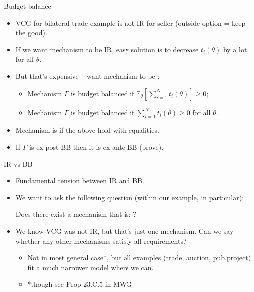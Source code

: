 \documentclass[english,10pt
,aspectratio=169
,handout
]{beamer}
\begin{document}
\begin{frame}{Budget balance}
\begin{itemize}
	\item VCG for bilateral trade example is not IR for seller (outside option = keep the good).
	\pause\medskip
	\item If we want mechanism to be IR, easy solution is to decrease $t_i(\theta)$ by a lot, for all $\theta$.
	\item But that's expensive -- want mechanism to be :
	\pause
	\begin{definition}[BB]
		\begin{itemize}
			\item Mechanism $\Gamma$ is  \alert{budget balanced} if $\mathbb{E}_\theta \left[ \sum_{i=1}^N t_i (\theta) \right] \geq 0$;
			\item Mechanism $\Gamma$ is  \alert{budget balanced} if $\sum_{i=1}^N t_i (\theta) \geq 0$ for all $\theta$.
		\end{itemize}
	\end{definition}
	\item Mechanism is  if the above hold with equalities.
	\item If $\Gamma$ is ex post BB then it is ex ante BB (prove).
\end{itemize}
\end{frame}


\begin{frame}{IR vs BB}
\begin{itemize}
	\item Fundamental tension between IR and BB.
	\item We want to ask the following question (within our  example, in particular):
	\begin{exampleblock}{}
		Does there exist a mechanism that is: ?
	\end{exampleblock}
	\pause
	\item We know VCG was not IR, but that's just one mechanism. Can we say whether any other mechanisms satisfy all requirements?
	\begin{itemize}
		\item Not in most general case*, but all examples (trade, auction, pub.project) fit a much narrower model where we can.
		\item *though see Prop 23.C.5 in MWG
	\end{itemize}
\end{itemize}
\end{frame}
\end{document}
